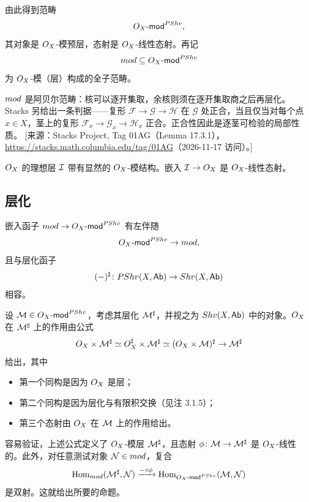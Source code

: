 由此得到范畴
\[
O_X\text{-}\mathsf{mod}^{PShv},
\]
其对象是 $O_X$-模预层，态射是 $O_X$-线性态射。再记
\[
mod\subseteq O_X\text{-}\mathsf{mod}^{PShv}
\]
为 $O_X$-模（层）构成的全子范畴。

\begin{yizhu}
$mod$ 是阿贝尔范畴：核可以逐开集取，余核则须在逐开集取商之后再层化。Stacks 另给出一条判据——复形 $\mathcal F\to\mathcal G\to\mathcal H$ 在 $\mathcal G$ 处正合，当且仅当对每个点 $x\in X$，茎上的复形 $\mathcal F_x\to\mathcal G_x\to\mathcal H_x$ 正合。正合性因此是逐茎可检验的局部性质。
[来源：Stacks Project, Tag 01AG（Lemma 17.3.1），\url{https://stacks.math.columbia.edu/tag/01AG}（2026-11-17 访问）。]
\end{yizhu}

\begin{example}\label{ex:12.1.4}
$O_X$ 的理想层 $\mathcal{I}$ 带有显然的 $O_X$-模结构。嵌入 $\mathcal{I}\to O_X$ 是 $O_X$-线性态射。
\end{example}

\subsection{层化}\label{sec:12.2}

\begin{proposition}\label{prop:12.2.1}
嵌入函子 $mod\to O_X\text{-}\mathsf{mod}^{PShv}$ 有左伴随
\[
O_X\text{-}\mathsf{mod}^{PShv}\to mod,
\]
且与层化函子
\[
(-)^{\sharp}\colon PShv(X,\mathsf{Ab})\to Shv(X,\mathsf{Ab})
\]
相容。
\end{proposition}

\begin{sketch}
设 $\mathcal{M}\in O_X\text{-}\mathsf{mod}^{PShv}$，考虑其层化 $\mathcal{M}^{\sharp}$，并视之为 $Shv(X,\mathsf{Ab})$ 中的对象。$O_X$ 在 $\mathcal{M}^{\sharp}$ 上的作用由公式
\[
O_X\times\mathcal{M}^{\sharp}\simeq O_X^{\sharp}\times\mathcal{M}^{\sharp}\simeq(O_X\times\mathcal{M})^{\sharp}\to\mathcal{M}^{\sharp}
\]
给出，其中
\begin{itemize}
  \item 第一个同构是因为 $O_X$ 是层；
  \item 第二个同构是因为层化与有限积交换（见注 3.1.5）；
  \item 第三个态射由 $O_X$ 在 $\mathcal{M}$ 上的作用给出。
\end{itemize}
容易验证，上述公式定义了 $O_X$-模层 $\mathcal{M}^{\sharp}$，且态射 $\phi\colon\mathcal{M}\to\mathcal{M}^{\sharp}$ 是 $O_X$-线性的。此外，对任意测试对象 $\mathcal{N}\in mod$，复合
\[
\operatorname{Hom}_{mod}(\mathcal{M}^{\sharp},\mathcal{N})\xrightarrow{-\circ\phi}\operatorname{Hom}_{O_X\text{-}\mathsf{mod}^{PShv}}(\mathcal{M},\mathcal{N})
\]
是双射。这就给出所要的命题。
\end{sketch}


